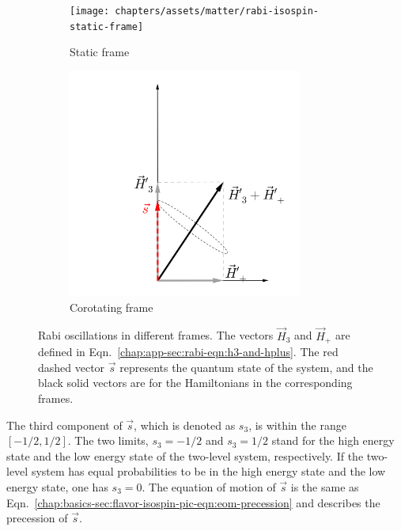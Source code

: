 \begin{figure}[htbp]
	\centering
	\begin{subfigure}[t]{0.5\textwidth}
		\centering
		\texttt{[image: chapters/assets/matter/rabi-isospin-static-frame]}
		\caption{Static frame}\label{chap:app-sec:rabi-fig:rabi-static-frame}
	\end{subfigure}%
	\begin{subfigure}[t]{0.5\textwidth}
		\centering
		\includegraphics[width=0.85\textwidth]{chapters/assets/matter/rabi-isospin-rotating-frame}
		\caption{Corotating frame}\label{chap:app-sec:rabi-fig:rabi-rotating-frame}
	\end{subfigure}
	\caption{
  Rabi oscillations in different frames. The vectors $\vec H_3$ and $\vec H_+$ are defined in Eqn.~\eqref{chap:app-sec:rabi-eqn:h3-and-hplus}. The red dashed vector $\vec s$ represents the quantum state of the system, and the black solid vectors are for the Hamiltonians in the corresponding frames.
  }\label{chap:app-sec:rabi-fig:rabi-frames}
\end{figure}


The third component of $\vec{s}$, which is denoted as $s_3$, is within the range $[-1/2,1/2]$. The two limits, $s_3=-1/2$ and $s_3=1/2$ stand for the high energy state and the low energy state of the two-level system, respectively. If the two-level system has equal probabilities to be in the high energy state and the low energy state, one has $s_3=0$. The equation of motion of $\vec s$ is the same as Eqn.~\eqref{chap:basics-sec:flavor-isospin-pic-eqn:eom-precession} and describes the precession of $\vec s$.

